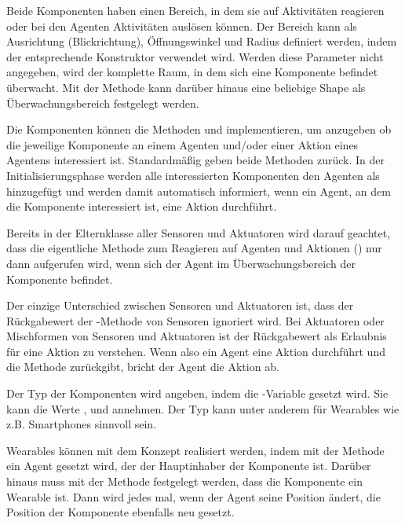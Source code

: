 Beide Komponenten haben einen Bereich, in dem sie auf Aktivitäten reagieren oder bei den Agenten Aktivitäten auslösen können. Der Bereich kann als Ausrichtung (Blickrichtung), Öffnungswinkel und Radius definiert werden, indem der entsprechende Konstruktor verwendet wird. Werden diese Parameter nicht angegeben, wird der komplette Raum, in dem sich eine Komponente befindet überwacht. Mit der Methode  kann darüber hinaus eine beliebige Shape als Überwachungsbereich festgelegt werden.

Die Komponenten können die Methoden  und  implementieren, um anzugeben ob die jeweilige Komponente an einem Agenten und/oder einer Aktion eines Agentens interessiert ist. Standardmäßig geben beide Methoden  zurück. In der Initialisierungsphase werden alle interessierten Komponenten den Agenten als  hinzugefügt und werden damit automatisch informiert, wenn ein Agent, an dem die Komponente interessiert ist, eine Aktion durchführt.

 Bereits in der Elternklasse  aller Sensoren und Aktuatoren wird darauf geachtet, dass die eigentliche Methode zum Reagieren auf Agenten und Aktionen () nur dann aufgerufen wird, wenn sich der Agent im Überwachungsbereich der Komponente befindet.

Der einzige Unterschied zwischen Sensoren und Aktuatoren ist, dass der Rückgabewert der -Methode von Sensoren ignoriert wird. Bei Aktuatoren oder Mischformen von Sensoren und Aktuatoren ist der Rückgabewert als Erlaubnis für eine Aktion zu verstehen. Wenn also ein Agent eine Aktion durchführt und die Methode  zurückgibt, bricht der Agent die Aktion ab.

Der Typ der Komponenten wird angeben, indem die -Variable gesetzt wird. Sie kann die Werte ,  und  annehmen. Der Typ  kann unter anderem für Wearables wie z.B. Smartphones sinnvoll sein.

Wearables können mit dem Konzept realisiert werden, indem mit der Methode  ein Agent gesetzt wird, der der Hauptinhaber der Komponente ist. Darüber hinaus muss mit der Methode  festgelegt werden, dass die Komponente ein Wearable ist. Dann wird jedes mal, wenn der Agent seine Position ändert, die Position der Komponente ebenfalls neu gesetzt.
